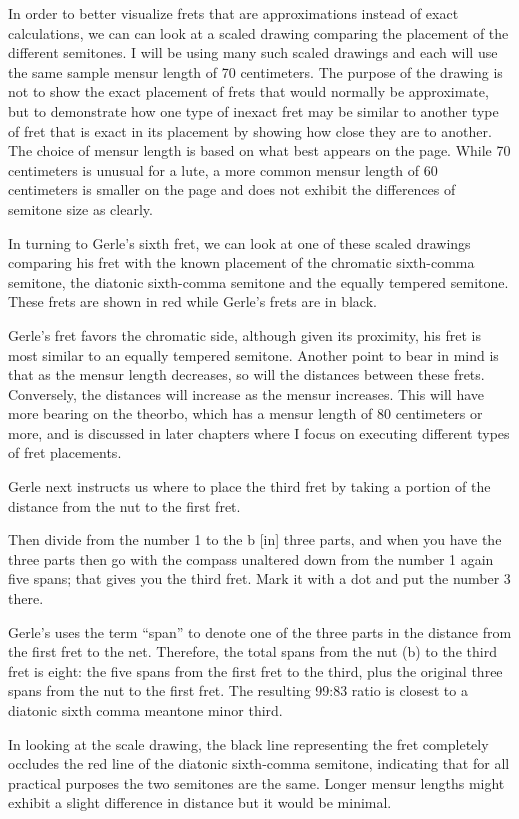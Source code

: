 In order to better visualize frets that are approximations instead of
exact calculations, we can can look at a scaled drawing comparing the placement of
the different semitones.  I will be using many such scaled drawings and each will use
the same sample mensur length of 70 centimeters.  The purpose of the drawing is not to
show the exact placement of frets that would normally be approximate, but to
demonstrate how one type of inexact fret may be similar to another type of fret that is
exact in its placement by showing how close they are to another.  The choice of mensur
length is based on what best appears on the page.  While 70 centimeters is unusual for
a lute, a more common mensur length of 60 centimeters is smaller on the page and does
not exhibit the differences of semitone size as clearly.

In turning to Gerle's sixth fret, we can look at one of these scaled drawings comparing
his fret with the known placement of the chromatic sixth-comma semitone, the diatonic
sixth-comma semitone and the equally tempered semitone.  These frets are shown in red
while Gerle's frets are in black.

Gerle's fret favors the chromatic side, although given its proximity,  his fret is most similar to
an equally tempered semitone.  Another point to bear in mind is that as the mensur length decreases,
so will the distances between these frets.  Conversely, the distances will increase as the mensur
increases.  This will have more bearing on the theorbo, which has a mensur length of 80 centimeters
or more, and is discussed in later chapters where I focus on executing different types of fret
placements.

Gerle next instructs us where to place the third fret by taking a portion of the 
distance from the nut to the first fret.
\begin{blocks}
Then divide from the number 1 to the b [in] three parts, and when you have the
three parts then go with the compass unaltered down from the number 1 again five
spans; that gives you the third fret.  Mark it with a dot and put the number 3
there.
\end{blocks}
Gerle's uses the term ``span'' to denote one of the three parts in the distance from
the first fret to the net. Therefore, the total spans from the nut (b) to the third fret 
is eight: the five spans
from the first fret to the third, plus the original three spans from the nut to
the first fret.  The resulting 99:83 ratio is closest to a diatonic sixth comma
meantone minor third.

In looking at the scale drawing, the black line representing the fret completely
occludes the red line of the diatonic sixth-comma semitone, indicating that for all
practical purposes the two semitones are the same.  Longer mensur lengths might exhibit
a slight difference in distance but it would be minimal.

